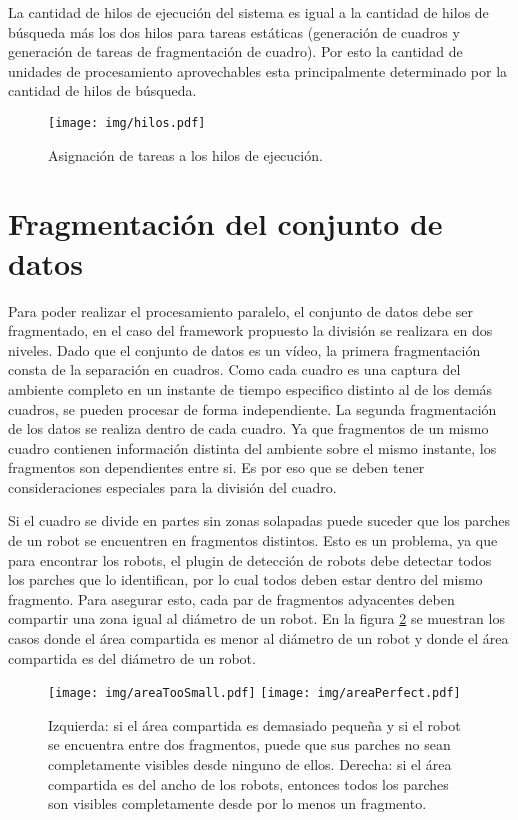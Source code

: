 La cantidad de hilos de ejecución del sistema es igual a la cantidad de hilos de
búsqueda más los dos hilos para tareas estáticas (generación de cuadros y
generación de tareas de fragmentación de cuadro). Por esto la cantidad de
unidades de procesamiento aprovechables esta principalmente determinado por la
cantidad de hilos de búsqueda.

\begin{figure}[h]

	\texttt{[image: img/hilos.pdf]}

	\caption{Asignación de tareas a los hilos de ejecución.}

	\label{hilosFramework}

\end{figure}

\section{Fragmentación del conjunto de datos}

Para poder realizar el procesamiento paralelo, el conjunto de datos debe ser
fragmentado, en el caso del framework propuesto la división se realizara en
dos niveles. Dado que el conjunto de datos es un vídeo, la primera
fragmentación consta de la separación en cuadros. Como cada cuadro es una
captura del ambiente completo en un instante de tiempo especifico distinto al de
los demás cuadros, se pueden procesar de forma independiente. La segunda
fragmentación de los datos se realiza dentro de cada cuadro. Ya que fragmentos
de un mismo cuadro contienen información distinta del ambiente sobre el mismo
instante, los fragmentos son dependientes entre si. Es por eso que se deben
tener consideraciones especiales para la división del cuadro.

Si el cuadro se divide en partes sin zonas solapadas puede suceder que los
parches de un robot se encuentren en fragmentos distintos. Esto es un problema,
ya que para encontrar los robots, el plugin de detección de robots debe detectar
todos los parches que lo identifican, por lo cual todos deben estar dentro del
mismo fragmento. Para asegurar esto, cada par de fragmentos adyacentes deben
compartir una zona igual al diámetro de un robot. En la figura
\ref{areaCompartida} se muestran los casos donde el área compartida es menor al
diámetro de un robot y donde el área compartida es del diámetro de un robot.

\begin{figure}[h]

	\centering
	\texttt{[image: img/areaTooSmall.pdf]}
	\texttt{[image: img/areaPerfect.pdf]}

	\caption{Izquierda: si el área compartida es demasiado pequeña y si el
	robot se encuentra entre dos fragmentos, puede que sus parches no sean
	completamente visibles desde ninguno de ellos. Derecha: si el área
	compartida es del ancho de los robots, entonces todos los parches son
	visibles completamente desde por lo menos un fragmento.}

	\label{areaCompartida}

\end{figure}

